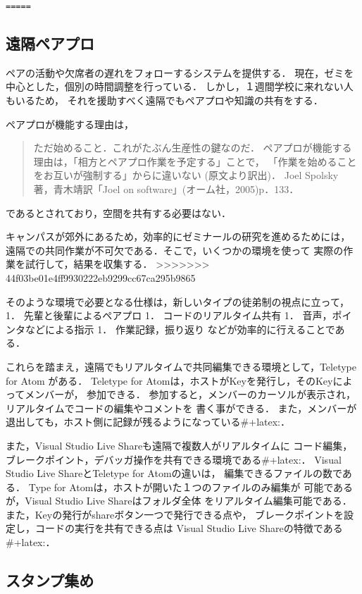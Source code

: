 \documentclass{hissymp}
\begin{document}
\texttt{=====}
\subsection{遠隔ペアプロ}
\label{sec:orga6d293d}
ペアの活動や欠席者の遅れをフォローするシステムを提供する．
現在，ゼミを中心とした，個別の時間調整を行っている．
しかし，１週間学校に来れない人もいるため，
それを援助すべく遠隔でもペアプロや知識の共有をする．

ペアプロが機能する理由は，
\begin{quote}
ただ始めること．これがたぶん生産性の鍵なのだ．
ペアプロが機能する理由は，「相方とペアプロ作業を予定する」ことで，
「作業を始めることをお互いが強制する」からに違いない
(原文より訳出)．
Joel Spolsky 著，青木靖訳「Joel on software」(オーム社，2005)p．133．
\end{quote}
であるとされており，空間を共有する必要はない．

キャンパスが郊外にあるため，効率的にゼミナールの研究を進めるためには，
遠隔での共同作業が不可欠である．そこで，いくつかの環境を使って
実際の作業を試行して，結果を収集する．
>>>>>>> 44f03be01e4ff9930222eb9299cc67ca295b9865

そのような環境で必要となる仕様は，新しいタイプの徒弟制の視点に立って，
1． 先輩と後輩によるペアプロ
1． コードのリアルタイム共有
1． 音声，ポインタなどによる指示
1． 作業記録，振り返り
などが効率的に行えることである．

これらを踏まえ，遠隔でもリアルタイムで共同編集できる環境として，Teletype for Atom
がある．
Teletype for Atomは，ホストがKeyを発行し，そのKeyによってメンバーが，
参加できる．
参加すると，メンバーのカーソルが表示され，
リアルタイムでコードの編集やコメントを
書く事ができる．
また，メンバーが退出しても，ホスト側に記録が残るようになっている\#+latex:\cite{Atom}．

また，Visual Studio Live Shareも遠隔で複数人がリアルタイムに
コード編集，ブレークポイント，デバッガ操作を共有できる環境である\#+latex:\cite{VSC}．
Visual Studio Live ShareとTeletype for Atomの違いは，
編集できるファイルの数である．
Type for Atomは，ホストが開いた１つのファイルのみ編集が
可能であるが，Visual Studio Live Shareはフォルダ全体
をリアルタイム編集可能である．
また，Keyの発行がshareボタン一つで発行できる点や，
ブレークポイントを設定し，コードの実行を共有できる点は
Visual Studio Live Shareの特徴である\#+latex:\cite{VSCRevie}．

\subsection{スタンプ集め}
\label{sec:org63e65e1}
\end{document}
